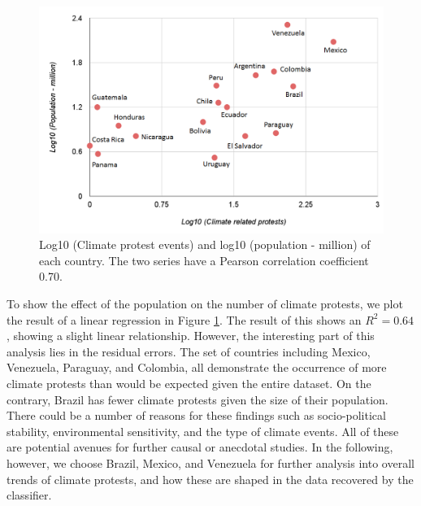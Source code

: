 \documentclass[9pt,twocolumn,twoside]{pnas-new}
\begin{document}



\begin{figure}[ht]
\centerline
{\includegraphics[width=.45\textwidth]{figures/protest-population}}
\caption{Log10 (Climate protest events) and log10 (population - million) of each country. The two series have a Pearson correlation coefficient 0.70.}
\label{protest-population}
\end{figure}

To show the effect of the population on the number of climate protests, we plot the result of a linear regression in Figure \ref{protest-population}.
The result of this shows an $R^2 = 0.64$, showing a slight linear relationship.
However, the interesting part of this analysis lies in the residual errors.
The set of countries including Mexico, Venezuela, Paraguay, and Colombia, all demonstrate the occurrence of more climate protests than would be expected given the entire dataset.
On the contrary, Brazil has fewer climate protests given the size of their population.
There could be a number of reasons for these findings such as socio-political stability, environmental sensitivity, and the type of climate events.
All of these are potential avenues for further causal or anecdotal studies.
In the following, however, we choose Brazil, Mexico, and Venezuela for further analysis into overall trends of climate protests, and how these are shaped in the data recovered by the classifier.
\end{document}
